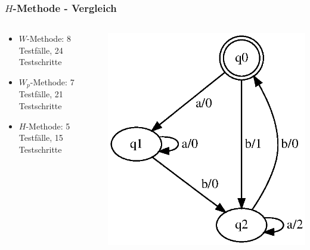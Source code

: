 \begin{frame}
\frametitle{$H$-Methode - Vergleich}
\begin{columns}[T] %

\begin{column}{.7\textwidth}
\begin{itemize}
    \item $W$-Methode: 8 Testfälle, 24 Testschritte
    \item $W_p$-Methode: 7 Testfälle, 21 Testschritte
    \item $H$-Methode: 5 Testfälle, 15 Testschritte
\end{itemize}
\end{column}%

\begin{column}{.50\textwidth}
\centering
\includegraphics[width=\textwidth]{images/fsm-example01_orig}%
\end{column}%

\end{columns}
\end{frame}

%

